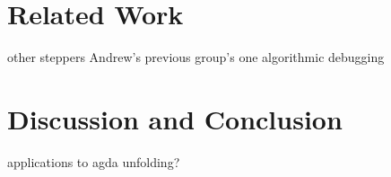 \documentclass[acmsmall,anonymous]{acmart}
\begin{document}
\section{Related Work}
other steppers
Andrew's previous group's one
algorithmic debugging

\section{Discussion and Conclusion}

applications to agda unfolding?



\end{document}
